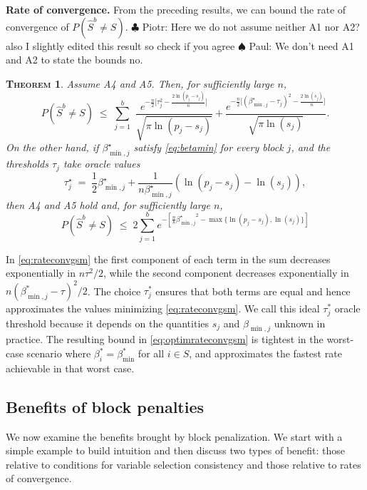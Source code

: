 \documentclass[aos]{imsart}
\theoremstyle{plain}
\newtheorem{thm}{\textsc{Theorem}}[section]
\newcommand{\piotr}[1]{{\small{\color{red} \sf $\clubsuit$ Piotr: #1}}}
\newcommand{\paul}[1]{{\small{\color{green} \sf $\spadesuit$ Paul: #1}}}
\begin{document}
\noindent\textbf{Rate of convergence.} From the
preceding results, we can bound the rate of convergence of $P(\hat S^{b}\neq S)$.\piotr{Here we do not assume neither A1 nor A2? also I slightly edited this result so check if you agree}\paul{We don't need A1 and A2 to state the bounds no.}
\begin{thm}\label{theo:fullrecovGS}
Assume A4 and A5. Then, for sufficiently large $n$,
\begin{equation} \label{eq:rateconvgsm}
P(\hat{S}^{b} \neq S)\;\leq\;\sum_{j=1}^b\,\,\frac{e^{-\tfrac{n}{2}\big[\tau_j^2-\tfrac{2\ln(p_j-s_j)}{n}\big]}}{\sqrt{\pi\ln(p_j-s_j)}}+\frac{e^{-\tfrac{n}{2}\big[(\beta^\star_{\min,j}-\tau_j)^2-\tfrac{2\ln(s_j)}{n}\big]}}{\sqrt{\pi\ln(s_j)}}.
\end{equation}
On the other hand, if $\beta^\star_{\min,j}$ satisfy \eqref{eq:betamin} for every block $j$, and the thresholds $\tau_j$ take oracle values
	\begin{equation} \label{eq:optimtauj}
\tau^\star_j \;=\; \frac{1}{2}\beta^\star_{\min,j}+\frac{1}{n\beta^\star_{\min,j}}(\ln({p_j-s_j})-\ln({s_j})),
\end{equation}
then A4 and A5 hold and, for sufficiently large $n$,
\begin{equation}\label{eq:optimrateconvgsm}
    P(\hat{S}^{b} \neq S) \; \leq \; 2 \sum_{j=1}^be^{-[\frac{n}{8}{\beta^\star_{\min,j}}^2-\max\{\ln(p_j-s_j),\ln(s_j)\}]}
\end{equation}
\end{thm}
In \eqref{eq:rateconvgsm} the first component of each term in the sum decreases exponentially in $n\tau^2/2$, while the second component decreases exponentially in $n(\beta_{\min,j}^*-\tau)^2/2$. The choice $\tau^*_j$ ensures that both terms are equal and hence approximates the values minimizing \eqref{eq:rateconvgsm}. We call this ideal $\tau^*_j$ oracle threshold because it depends on the quantities $s_j$ and $\beta_{\min,j}$ unknown in practice.  
The resulting bound in \eqref{eq:optimrateconvgsm} is tightest in the worst-case scenario where $\beta_i^*=\beta_{\min}^*$ for all $i \in S$, and approximates the fastest rate achievable in that worst case.
\subsection{Benefits of block penalties}\label{sec:prosconsblock}


We now examine the benefits brought by block penalization. We start with a simple example to build intuition and then discuss
two types of benefit: those relative to conditions for variable selection consistency and those relative to rates of convergence.
\bigskip
\end{document}
